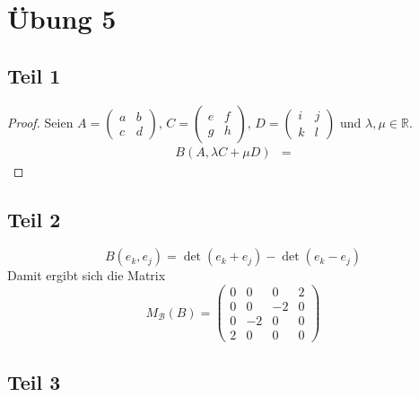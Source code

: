 \documentclass[10pt,a4paper]{article}
\begin{document}
\section*{Übung 5}

\subsection*{Teil 1}

\begin{proof}
Seien $A = \begin{pmatrix}a&b\\c&d\end{pmatrix}$, $C = \begin{pmatrix}e&f\\g&h\end{pmatrix}$, $D = \begin{pmatrix}i&j\\k&l\end{pmatrix}$ und $\lambda, \mu \in \mathbb{R}$.
\begin{align*}
B(A, \lambda C + \mu D) & = 
\end{align*}
\end{proof}

\subsection*{Teil 2}

\begin{equation}
B(e_{k}, e_{j}) = \det(e_{k} + e_{j}) - \det(e_{k} - e_{j})
\end{equation}
Damit ergibt sich die Matrix
\begin{equation}
M_{\mathcal{B}}(B) = \begin{pmatrix}
0 & 0 & 0 & 2\\
0 & 0 & -2 & 0\\
0 & -2 & 0 & 0\\
2 & 0 & 0 & 0
\end{pmatrix}
\end{equation}

\subsection*{Teil 3}
\end{document}
